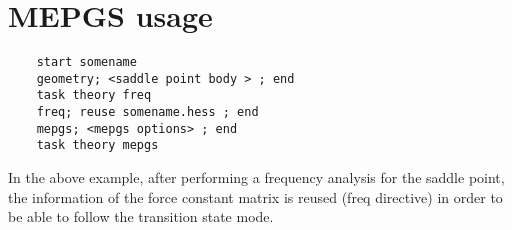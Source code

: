 \section{MEPGS usage}

\begin{verbatim}
    start somename
    geometry; <saddle point body > ; end   
    task theory freq
    freq; reuse somename.hess ; end
    mepgs; <mepgs options> ; end
    task theory mepgs
\end{verbatim}

In the above example, after performing a frequency analysis for the saddle 
point, the information of the force constant matrix is reused (freq directive) 
in order to be able to follow the transition state mode.

\fussy


